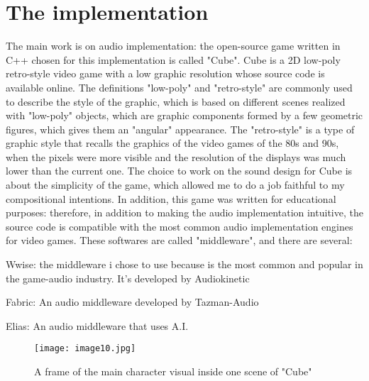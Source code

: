 
\chapter{The implementation}
\label{chp:fundamentals}

The main work is on audio implementation: the open-source game written in C++ chosen for this implementation is called "Cube".
Cube is a 2D low-poly retro-style video game with a low graphic resolution whose source code is available online. The definitions "low-poly" and "retro-style" are commonly used to describe the style of the graphic, which is based on different scenes realized with "low-poly" objects, which are graphic components formed by a few geometric figures, which gives them an "angular" appearance. The "retro-style" is a type of graphic style that recalls the graphics of the video games of the 80s and 90s, when the pixels were more visible and the resolution of the displays was much lower than the current one.
The choice to work on the sound design for Cube is about the simplicity of the game, which allowed me to do a job faithful to my compositional intentions. In addition, this game was written for educational purposes: therefore, in addition to making the audio implementation intuitive, the source code is compatible with the most common audio implementation engines for video games. These softwares are called "middleware", and there are several:

\begin{compactitem}
	\item Wwise: the middleware i chose to use because is the most common and popular in the game-audio industry. It's developed by Audiokinetic
	\item Fabric: An audio middleware developed by Tazman-Audio
	\item Elias: An audio middleware that uses A.I.
\end{compactitem}

\begin{figure}[h]
	\begin{center}
		\texttt{[image: image10.jpg]}
		\caption{A frame of the main character visual inside one scene of "Cube"}
	\end{center}
\end{figure}

